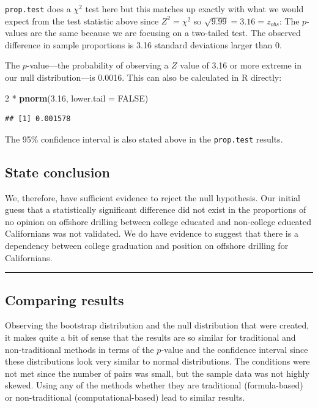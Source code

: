 \documentclass[]{tufte-book}
\newenvironment{Shaded}{\begin{snugshade}}{\end{snugshade}}
\newcommand{\KeywordTok}[1]{\textcolor[rgb]{0.13,0.29,0.53}{\textbf{{#1}}}}
\newcommand{\DataTypeTok}[1]{\textcolor[rgb]{0.13,0.29,0.53}{{#1}}}
\newcommand{\DecValTok}[1]{\textcolor[rgb]{0.00,0.00,0.81}{{#1}}}
\newcommand{\FloatTok}[1]{\textcolor[rgb]{0.00,0.00,0.81}{{#1}}}
\newcommand{\StringTok}[1]{\textcolor[rgb]{0.31,0.60,0.02}{{#1}}}
\newcommand{\OtherTok}[1]{\textcolor[rgb]{0.56,0.35,0.01}{{#1}}}
\newcommand{\NormalTok}[1]{{#1}}
\let\oldrule=\rule
\renewcommand{\rule}[1]{\oldrule{\linewidth}}
\begin{document}
\texttt{prop.test} does a \(\chi^2\) test here but this matches up
exactly with what we would expect from the test statistic above since
\(Z^2 = \chi^2\) so \(\sqrt{9.99} = 3.16 = z_{obs}\): The \(p\)-values
are the same because we are focusing on a two-tailed test. The observed
difference in sample proportions is 3.16 standard deviations larger than
0.

The \(p\)-value---the probability of observing a \(Z\) value of 3.16 or
more extreme in our null distribution---is 0.0016. This can also be
calculated in R directly:

\begin{Shaded}
\begin{Highlighting}[]
\DecValTok{2} \NormalTok{*}\StringTok{ }\KeywordTok{pnorm}\NormalTok{(}\FloatTok{3.16}\NormalTok{, }\DataTypeTok{lower.tail =} \OtherTok{FALSE}\NormalTok{)}
\end{Highlighting}
\end{Shaded}

\begin{verbatim}
## [1] 0.001578
\end{verbatim}

The 95\% confidence interval is also stated above in the
\texttt{prop.test} results.

\subsection{State conclusion}\label{state-conclusion-2}

We, therefore, have sufficient evidence to reject the null hypothesis.
Our initial guess that a statistically significant difference did not
exist in the proportions of no opinion on offshore drilling between
college educated and non-college educated Californians was not
validated. We do have evidence to suggest that there is a dependency
between college graduation and position on offshore drilling for
Californians.

\begin{center}\rule{0.5\linewidth}{\linethickness}\end{center}

\subsection{Comparing results}\label{comparing-results-2}

Observing the bootstrap distribution and the null distribution that were
created, it makes quite a bit of sense that the results are so similar
for traditional and non-traditional methods in terms of the \(p\)-value
and the confidence interval since these distributions look very similar
to normal distributions. The conditions were not met since the number of
pairs was small, but the sample data was not highly skewed. Using any of
the methods whether they are traditional (formula-based) or
non-traditional (computational-based) lead to similar results.
\end{document}
